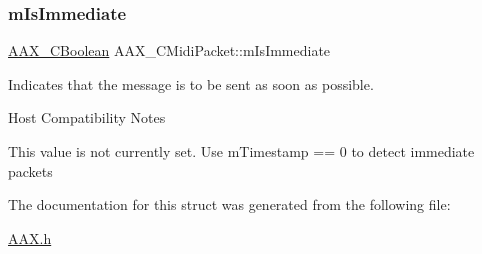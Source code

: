 \mbox{\label{a01429_ab6fce0aee8fb08695ac8a112b3c3e7fa}} 
\subsubsection{\texorpdfstring{mIsImmediate}{mIsImmediate}}
{\footnotesize\ttfamily \mbox{\hyperlink{a00392_aa216506530f1d19a2965931ced2b274b}{A\+A\+X\+\_\+\+C\+Boolean}} A\+A\+X\+\_\+\+C\+Midi\+Packet\+::m\+Is\+Immediate}



Indicates that the message is to be sent as soon as possible. 

\begin{DoxyRefDesc}{Host Compatibility Notes}
\item[\mbox{\hyperlink{a00786__compatibility_notes000025}{Host Compatibility Notes}}]This value is not currently set. Use {\ttfamily m\+Timestamp == 0} to detect immediate packets \end{DoxyRefDesc}


The documentation for this struct was generated from the following file\+:\begin{DoxyCompactItemize}
\item 
\mbox{\hyperlink{a00392}{A\+A\+X.\+h}}\end{DoxyCompactItemize}
